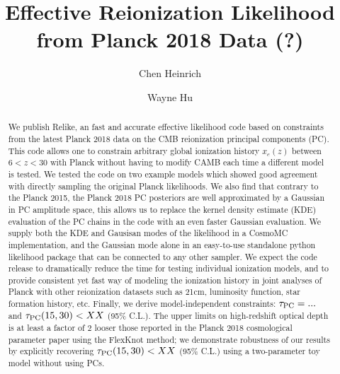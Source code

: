 \documentclass[prd,twocolumn,amsmath,amssymb,floatfix,superscriptaddress,nofootinbib]{revtex4-1}
\begin{document}
	
\title{Effective Reionization Likelihood from Planck 2018 Data (?)}

\author{Chen Heinrich}

\author{Wayne Hu}

\begin{abstract}

We publish Relike, an fast and accurate effective likelihood code based on constraints from the latest Planck 2018 data on the CMB reionization principal components (PC). This code allows one to constrain arbitrary global ionization history $x_e(z)$ between $6 < z < 30$ with Planck without having to modify CAMB each time a different model is tested. We tested the code on two example models
which showed good agreement with directly 
sampling the original Planck likelihoods.
We also find that contrary to the Planck 2015, the Planck 2018 PC posteriors are well approximated by a Gaussian in PC amplitude space, this allows us to replace the kernel density estimate (KDE) evaluation of the PC chains in the code with an even faster Gaussian evaluation. We supply both the KDE and Gausisan modes of the likelihood in a CosmoMC implementation, and the Gaussian mode alone in an easy-to-use standalone python likelihood package that can be connected to any other sampler. We expect the code release to dramatically reduce the time for testing individual ionization models, and to provide consistent yet fast way of modeling the ionization history in joint analyses of Planck with other reionization datasets such as 21cm, luminosity function, star formation history, etc.
Finally, we derive model-independent constraints: $\tau_{\rm PC} = ...$ and $\tau_{\rm PC}(15, 30) < XX $ (95\% C.L.). The upper limits on high-redshift optical depth is at least a factor of 2 looser those reported in the Planck 2018 cosmological parameter paper using the FlexKnot method; we demonstrate robustness of our results by explicitly recovering  $\tau_{\rm PC}(15, 30) < XX $ (95\% C.L.) using a  two-parameter toy model without using PCs.  

\end{abstract}
\pacs{}
\end{document}
